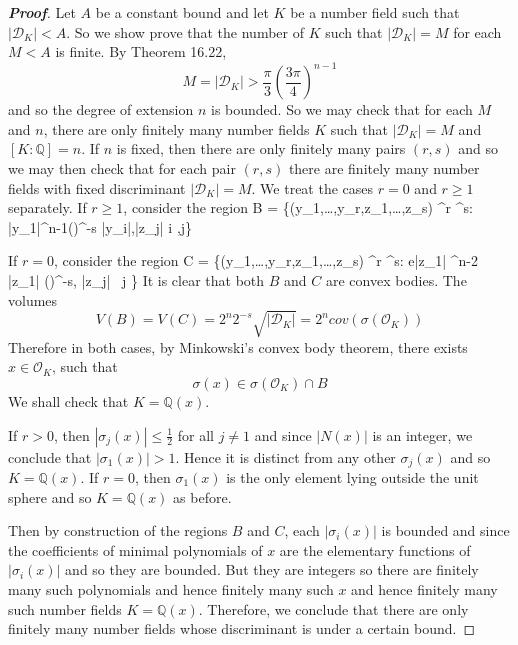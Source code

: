 \begin{proof}[\bf Proof] Let $A$ be a constant bound and let $K$ be a number field such that $|\mathcal{D}_K|<A$.
So we show prove that the number of $K$ such that $|\mathcal{D}_K|=M$ for each $M<A$ is finite.
By Theorem 16.22,
$$M=|\mathcal{D}_K| >\frac{\pi}{3}\left(\frac{3\pi}{4}\right)^{n-1}$$
and so the degree of extension $n$ is bounded. So we may check that for each $M$ and $n$, there are only finitely many number fields $K$ such that $|\mathcal{D}_K|=M$ and $[K:\mathbb{Q}]=n$. If $n$ is fixed, then there are only finitely many pairs $(r,s)$ and so we may then check that for each pair $(r,s)$ there are finitely many number fields with fixed discriminant $|\mathcal{D}_K|=M$. We treat the cases $r=0$ and $r \ge 1$ separately.
If $r\ge 1$, consider the region
\be
B = \left\{(y_1,\ldots,y_r,z_1,\ldots,z_s) \in {}^r \times {}^s: |y_1|^{n-1}\left(\right)^{-s} |y_i|,|z_j| \le {} \forall i ,\forall j\right\}
\ee

If $r=0$, consider the region
\be
C = \left\{(y_1,\ldots,y_r,z_1,\ldots,z_s) \in {}^r \times {}^s: e|z_1| ^{n-2} \Im|z_1| \le {}\left(\right)^{-s}, |z_j| \le {}~\forall j \right\}
\ee
It is clear that both $B$ and $C$ are convex bodies. The volumes
$$V(B)=V(C)=2^n2^{-s}\sqrt{|\mathcal{D}_K|}=2^n cov(\sigma(\mathcal{O}_K))$$
Therefore in both cases, by Minkowski's convex body theorem, there exists $x \in \mathcal{O}_K$, such that
$$\sigma(x) \in \sigma(\mathcal{O}_K) \cap B$$
We shall check that $K=\mathbb{Q}(x)$.

If $r>0$, then $|\sigma_j(x)| \le \frac{1}{2}$ for all $j \neq 1$ and since $|N(x)|$ is an integer, we conclude that $|\sigma_1(x)| >1$. Hence it is distinct from any other $\sigma_j(x)$ and so $K=\mathbb{Q}(x)$.
If $r=0$, then $\sigma_1(x)$ is the only element lying outside the unit sphere and so $K=\mathbb{Q}(x)$ as before.

Then by construction of the regions $B$ and $C$, each $|\sigma_i(x)|$ is bounded and since the coefficients of
minimal polynomials of $x$ are the elementary functions of $|\sigma_i(x)|$ and so they are bounded. But they are
integers so there are finitely many such polynomials and hence finitely many such $x$ and hence finitely many
such number fields $K=\mathbb{Q}(x)$. Therefore, we conclude that there are only finitely many number fields whose discriminant is under a certain bound.
\end{proof}
